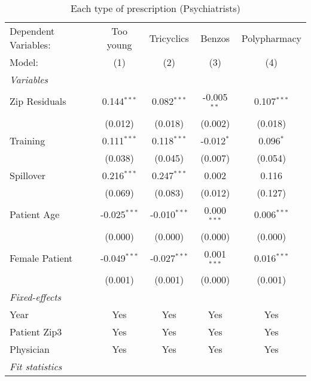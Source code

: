 
\begin{table}[htbp]
   \centering
   \begin{threeparttable}[b]
      \caption{Each type of prescription (Psychiatrists)}
      \begin{tabular}{lcccc}
         \tabularnewline \midrule \midrule
         Dependent Variables:    & Too young      & Tricyclics     & Benzos        & Polypharmacy\\  
         Model:                  & (1)            & (2)            & (3)           & (4)\\  
         \midrule
         \emph{Variables}\\
         Zip Residuals           & 0.144$^{***}$  & 0.082$^{***}$  & -0.005$^{**}$ & 0.107$^{***}$\\   
                                 & (0.012)        & (0.018)        & (0.002)       & (0.018)\\   
         Training                & 0.111$^{***}$  & 0.118$^{***}$  & -0.012$^{*}$  & 0.096$^{*}$\\   
                                 & (0.038)        & (0.045)        & (0.007)       & (0.054)\\   
         Spillover               & 0.216$^{***}$  & 0.247$^{***}$  & 0.002         & 0.116\\   
                                 & (0.069)        & (0.083)        & (0.012)       & (0.127)\\   
         Patient Age             & -0.025$^{***}$ & -0.010$^{***}$ & 0.000$^{***}$ & 0.006$^{***}$\\   
                                 & (0.000)        & (0.000)        & (0.000)       & (0.000)\\   
         Female Patient          & -0.049$^{***}$ & -0.027$^{***}$ & 0.001$^{***}$ & 0.016$^{***}$\\   
                                 & (0.001)        & (0.001)        & (0.000)       & (0.001)\\   
         \midrule
         \emph{Fixed-effects}\\
         Year                    & Yes            & Yes            & Yes           & Yes\\  
         Patient Zip3            & Yes            & Yes            & Yes           & Yes\\  
         Physician               & Yes            & Yes            & Yes           & Yes\\  
         \midrule
         \emph{Fit statistics}\\

\end{tabular}
\end{threeparttable}
\end{table}
